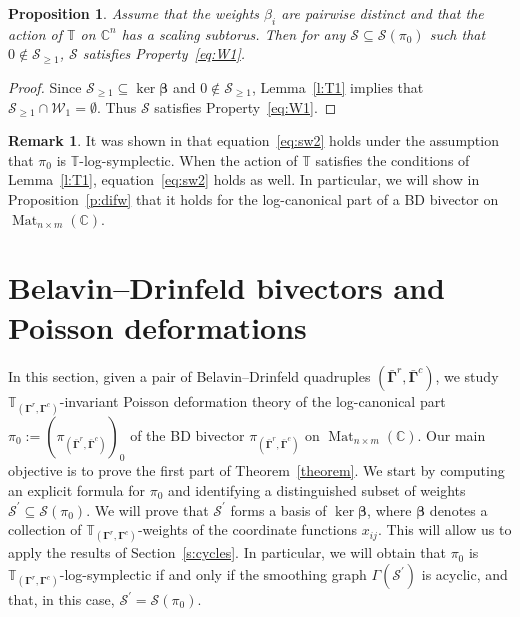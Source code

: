 \documentclass[11pt]{article}
\newcommand{\bbeta}{\boldsymbol{\beta}}
\newcommand{\bbg}{\bar{\mathbf{\Gamma}}}
\newcommand{\bg}{\mathbf{\Gamma}}
\DeclareMathOperator{\Mat}{Mat}
\newtheorem{proposition}[theorem]{Proposition}%
\theoremstyle{definition}\newtheorem{definition}[theorem]{Definition}
\theoremstyle{definition}\newtheorem{remark}[theorem]{Remark}
\theoremstyle{remark}
\numberwithin{equation}{section}
\begin{document}
\begin{proposition}\label{p:w1check}
   Assume that the weights $\beta_i$ are pairwise distinct and that the action of $\mathbb{T}$ on $\mathbb{C}^n$ has a scaling subtorus. Then for any $\mathcal{S}\subseteq \mathcal{S}(\pi_0)$ such that $0 \notin \mathcal{S}_{\geq 1}$, $\mathcal{S}$ satisfies Property~\eqref{eq:W1}.
\end{proposition}
\begin{proof}
    Since $\mathcal{S}_{\geq 1} \subseteq \ker \bbeta$ and $0 \notin \mathcal{S}_{\geq 1}$,  Lemma~\ref{l:T1} implies that $\mathcal{S}_{\geq 1} \cap \mathcal{W}_1 = \emptyset$. Thus $\mathcal{S}$ satisfies Property~\eqref{eq:W1}. 
\end{proof}

\begin{remark}
    It was shown in \cite[Section 2.2]{lm-deform} that equation~\eqref{eq:sw2} holds under the assumption that $\pi_0$ is $\mathbb{T}$-log-symplectic. When the action of $\mathbb{T}$ satisfies the conditions of Lemma~\ref{l:T1}, equation~\eqref{eq:sw2} holds as well. In particular, we will show in Proposition~\ref{p:difw} that it holds for the log-canonical part of a BD bivector on $\Mat_{n\times m}(\mathbb{C})$.
\end{remark}

\section{Belavin--Drinfeld bivectors and Poisson deformations}\label{s:main}
In this section, given a pair of Belavin--Drinfeld quadruples $(\bbg^r,\bbg^c)$, we study $\mathbb{T}_{(\bg^r,\bg^c)}$-invariant Poisson deformation theory of the log-canonical part $\pi_0:=(\pi_{(\bbg^r,\bbg^c)})_0$ of the BD bivector $\pi_{(\bbg^r,\bbg^c)}$ on $\Mat_{n\times m}(\mathbb{C})$. Our main objective is to prove the first part of Theorem~\ref{theorem}. We start by computing an explicit formula for $\pi_0$ and identifying a distinguished subset of weights $\mathcal{S}^\prime \subseteq \mathcal{S}(\pi_0)$. We will prove that $\mathcal{S}^\prime$ forms a basis of $\ker \bbeta$, where $\bbeta$ denotes a collection of $\mathbb{T}_{(\bg^r,\bg^c)}$-weights of the coordinate functions $x_{ij}$. This will allow us to apply the results of Section~\ref{s:cycles}. In particular, we will obtain that $\pi_0$ is $\mathbb{T}_{(\bg^r,\bg^c)}$-log-symplectic if and only if the smoothing graph $\Gamma(\mathcal{S}^\prime)$ is acyclic, and that, in this case, $\mathcal{S}^\prime = \mathcal{S}(\pi_0)$. 
\end{document}
